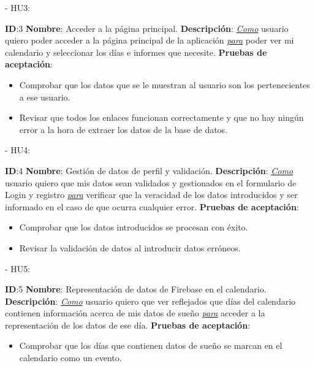 \documentclass[11pt,openany]{book}
\begin{document}
- HU3:
 
\textbf{ID}:3 \textbf{Nombre}: Acceder a la página principal.\linebreak
\textbf{Descripción}: \textit{\underline{Como}} usuario quiero poder acceder a la página principal de la aplicación \textit{\underline{para}} poder ver mi calendario y seleccionar los días e informes que necesite.\linebreak
\textbf{Pruebas de aceptación}:
\begin{itemize}
\item Comprobar que los datos que se le muestran al usuario son los pertenecientes a ese usuario.
\item Revisar que todos los enlaces funcionan correctamente y que no hay ningún error a la hora de extraer los datos de la base de datos.
\end{itemize}
 
- HU4:
 
\textbf{ID}:4 \textbf{Nombre}: Gestión de datos de perfil y validación.\linebreak
\textbf{Descripción}: \textit{\underline{Como}} usuario quiero que mis datos sean validados y gestionados en el formulario de Login y registro \textit{\underline{para}} verificar que la veracidad de los datos introducidos y ser informado en el caso de que ocurra cualquier error.\linebreak
\textbf{Pruebas de aceptación}:
\begin{itemize}
\item Comprobar que los datos introducidos se procesan con éxito.
\item Revisar la validación de datos al introducir datos erróneos.
\end{itemize}
 
- HU5:
 
\textbf{ID}:5 \textbf{Nombre}: Representación de datos de Firebase en el calendario.\linebreak
\textbf{Descripción}: \textit{\underline{Como}} usuario quiero que ver reflejados que días del calendario contienen información acerca de mis datos de sueño \textit{\underline{para}} acceder a la representación de los datos de ese día.\linebreak
\textbf{Pruebas de aceptación}:
\begin{itemize}
\item Comprobar que los días que contienen datos de sueño se marcan en el calendario como un evento.
\end{itemize}
 
\end{document}

